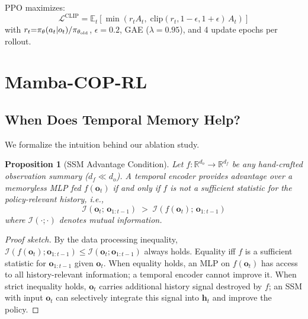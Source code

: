 \documentclass[conference]{IEEEtran}
\def\vec#1{\mathbf{#1}}
\newtheorem{proposition}{Proposition}
\begin{document}
PPO \cite{schulman2017proximal} maximizes:
\begin{equation}
  \mathcal{L}^{\mathrm{CLIP}} = \mathbb{E}_t\!\left[
    \min\!\left(r_t A_t,\;
    \mathrm{clip}(r_t, 1{-}\epsilon, 1{+}\epsilon)\, A_t
    \right)
  \right]
  \label{eq:ppo}
\end{equation}
with $r_t {=} \pi_\theta(a_t|o_t)/\pi_{\theta_{\rm old}}$,
$\epsilon{=}0.2$, GAE ($\lambda{=}0.95$), and 4 update epochs
per rollout.


\section{Mamba-COP-RL}
\label{sec:method}

\subsection{When Does Temporal Memory Help?}

We formalize the intuition behind our ablation study.

\begin{proposition}[SSM Advantage Condition]
\label{prop:ssm_advantage}
Let $f: \mathbb{R}^{d_o} \to \mathbb{R}^{d_f}$ be any hand-crafted
observation summary ($d_f \ll d_o$).
A temporal encoder provides advantage over a memoryless MLP fed
$f(\vec{o}_t)$ if and only if $f$ is \emph{not} a sufficient
statistic for the policy-relevant history, i.e.,
\begin{equation}
  \mathcal{I}(\vec{o}_t;\, \vec{o}_{1:t-1}) \;>\;
  \mathcal{I}(f(\vec{o}_t);\, \vec{o}_{1:t-1})
  \label{eq:prop}
\end{equation}
where $\mathcal{I}(\cdot;\cdot)$ denotes mutual information.
\end{proposition}

\begin{proof}[Proof sketch]
By the data processing inequality, $\mathcal{I}(f(\vec{o}_t);
\vec{o}_{1:t-1}) \leq \mathcal{I}(\vec{o}_t; \vec{o}_{1:t-1})$
always holds.
Equality iff $f$ is a sufficient statistic for $\vec{o}_{1:t-1}$
given $\vec{o}_t$.
When equality holds, an MLP on $f(\vec{o}_t)$ has access to all
history-relevant information; a temporal encoder cannot improve it.
When strict inequality holds, $\vec{o}_t$ carries additional history
signal destroyed by $f$; an SSM with input $\vec{o}_t$ can
selectively integrate this signal into $\vec{h}_t$ and improve
the policy.
\end{proof}
\end{document}
